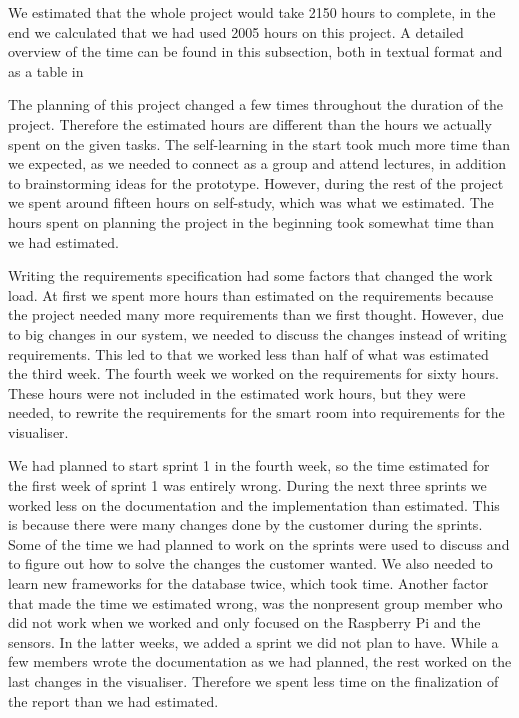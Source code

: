 \documentclass[../document]{subfiles}
\begin{document}
We estimated that the whole project would take 2150 hours to complete, in the end we calculated that we had used 2005 hours on this project. A detailed overview of the time can be found in this subsection, both in textual format and as a table in 


The planning of this project changed a few times throughout the duration of the project. Therefore the estimated hours are different than the hours we actually spent on the given tasks. The self-learning in the start took much more time than we expected, as we needed to connect as a group and attend lectures, in addition to brainstorming ideas for the prototype. However, during the rest of the project we spent around fifteen hours on self-study, which was what we estimated. The hours spent on planning the project in the beginning took somewhat time than we had estimated. 

Writing the requirements specification had some factors that changed the work load. At first we spent more hours than estimated on the requirements because the project needed many more requirements than we first thought. However, due to big changes in our system, we needed to discuss the changes instead of writing requirements. This led to that we worked less than half of what was estimated the third week. The fourth week we worked on the requirements for sixty hours. These hours were not included in the estimated work hours, but they were needed, to rewrite the requirements for the smart room into requirements for the visualiser.

We had planned to start sprint 1 in the fourth week, so the time estimated for the first week of sprint 1 was entirely wrong. During the next three sprints we worked less on the documentation and the implementation than estimated. This is because there were many changes done by the customer during the sprints. Some of the time we had planned to work on the sprints were used to discuss and to figure out how to solve the changes the customer wanted. We also needed to learn new frameworks for the database twice, which took time. Another factor that made the time we estimated wrong, was the nonpresent group member who did not work when we worked and only focused on the Raspberry Pi and the sensors. In the latter weeks, we added a sprint we did not plan to have. While a few members wrote the documentation as we had planned, the rest worked on the last changes in the visualiser. Therefore we spent less time on the finalization of the report than we had estimated. 
\end{document}

